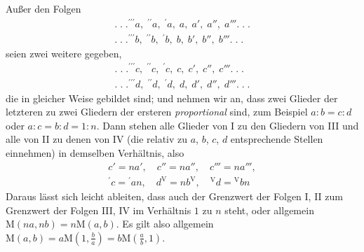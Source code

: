 Außer den Folgen
\[
\begin{array}{l}
.\;.\;.{}^{\prime\prime\prime}a,\;{}^{\prime\prime}a,\;{}^{\prime}a,\; a,\; a',\; a'',\; a'''.\;.\;.\\[6pt]
.\;.\;.{}^{\prime\prime\prime}b,\;{}^{\prime\prime}b,\;{}^{\prime}b,\; b,\; b',\; b'',\; b'''.\;.\;.
\end{array}
\]
seien zwei weitere gegeben,
\[
\begin{array}{l}
.\;.\;.{}^{\prime\prime\prime}c,\;{}^{\prime\prime}c,\;{}^{\prime}c,\; c,\; c',\; c'',\; c'''.\;.\;.\\[6pt]
.\;.\;.{}^{\prime\prime\prime}d,\;{}^{\prime\prime}d,\;{}^{\prime}d,\; d,\; d',\; d'',\; d'''.\;.\;.
\end{array}
\]
die in gleicher Weise gebildet sind; und nehmen wir an, dass zwei Glieder der letzteren
zu zwei Gliedern der ersteren \textit{proportional} sind, zum Beispiel $a:b=c:d$ oder $a:c=b:d=1:n$.
Dann stehen alle Glieder von I zu den Gliedern von III und alle von II zu denen von IV
(die relativ zu $a$, $b$, $c$, $d$ entsprechende Stellen einnehmen) in demselben Verhältnis, also
\[
\begin{gathered}c'=na',\quad c''=na'',\quad c'''=na''',\\ {}^{\prime}c={}^{\prime}an,\quad d^{\mathrm V}=nb^{\mathrm V},\quad{}^{\mathrm V}d={}^{\mathrm V}bn\end{gathered}
\]
Daraus lässt sich leicht ableiten, dass auch der Grenzwert der Folgen I, II zum Grenzwert der Folgen
III, IV im Verhältnis $1$ zu $n$ steht, oder allgemein $\mathrm M(na,nb)=n\mathrm M(a,b)$.
Es gilt also allgemein $\mathrm M(a,b)=a\mathrm M(1,\frac{b}{a})=b\mathrm M(\frac{a}{b},1)$.

\clearpage
\endgroup
